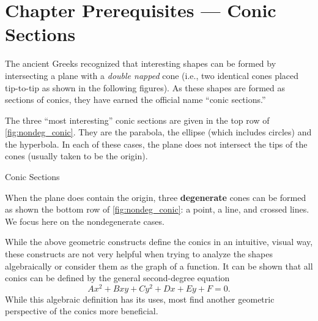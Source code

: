 \section{Chapter Prerequisites --- Conic Sections}
\label{sec:conic_sections}

\prereqIntro

The ancient Greeks recognized that interesting shapes can be formed by intersecting a plane with a 
\textit{double napped} cone (i.e., two identical cones placed tip-to-tip as shown in the following figures). As these shapes are formed as sections of conics, they have earned the official name ``conic sections.''

The three ``most interesting'' conic sections are given in the top row of \autoref{fig:nondeg_conic}. They are the parabola, the ellipse (which includes circles) and the hyperbola. In each of these cases, the plane does not intersect the tips of the cones (usually taken to be the origin).

\noindent\begin{minipage}[t]{\linewidth}\noindent%
\captionsetup{type=figure}%
\caption{Conic Sections}\label{fig:nondeg_conic}
\end{minipage}

When the plane does contain the origin, three \textbf{degenerate} cones can be formed as shown the bottom row of \autoref{fig:nondeg_conic}: a point, a line, and crossed lines. We focus here on the nondegenerate cases.

While the above geometric constructs define the conics in an intuitive, visual way, these constructs are not very helpful when trying to analyze the shapes algebraically or consider them as the graph of a function. It can be shown that all conics can be defined by the general second-degree equation
\[Ax^2+Bxy+Cy^2+Dx+Ey+F=0.\]
While this algebraic definition has its uses, most find another geometric perspective of the conics more beneficial.

